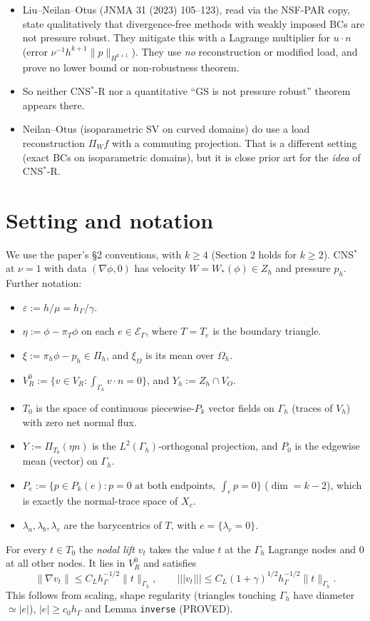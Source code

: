 \documentclass[11pt]{article}
\theoremstyle{remark}
\newcommand{\tn}[1]{|\!|\!|#1|\!|\!|}
\newcommand{\hG}{h_\Gamma}
\newcommand{\Gh}{\Gamma_h}
\begin{document}
\begin{enumerate}
\begin{itemize}
 instruction, and search engines return only its title.
 \item Liu--Neilan--Otus (JNMA 31 (2023) 105--123), read via the NSF-PAR copy, state qualitatively that divergence-free
 methods with weakly imposed BCs are not pressure robust. They mitigate this with a Lagrange multiplier for $u\cdot n$
 (error $\nu^{-1}h^{k+1}\|p\|_{H^{k+1}}$). They use \emph{no} reconstruction or modified load, and prove no lower bound or
 non-robustness theorem.
 \item So neither CNS$^\ast$-R nor a quantitative ``GS is not pressure robust'' theorem appears there.
 \item Neilan--Otus (isoparametric SV on curved domains) do use a load reconstruction $\Pi_W f$ with a commuting
 projection. That is a different setting (exact BCs on isoparametric domains), but it is close prior art for the
 \emph{idea} of CNS$^\ast$-R.
 \end{itemize}
\end{enumerate}

\section{Setting and notation}
We use the paper's §2 conventions, with $k\ge4$ (Section 2 holds for $k\ge2$). CNS$^\ast$ at $\nu=1$ with data $(\nabla\phi,0)$
has velocity $W=W_\ast(\phi)\in Z_h$ and pressure $p_h$. Further notation:
\begin{itemize}
\item $\varepsilon:=h/\mu=\hG/\gamma$.
\item $\eta:=\phi-\pi_T\phi$ on each $e\in\mathcal E_\Gamma$, where $T=T_e$ is the boundary triangle.
\item $\xi:=\pi_h\phi-p_h\in\Pi_h$, and $\xi_\Omega$ is its mean over $\Omega_h$.
\item $V_R^0:=\{v\in V_R:\int_{\Gh}v\cdot n=0\}$, and $Y_h:=Z_h\cap V_O$.
\item $T_0$ is the space of continuous piecewise-$P_k$ vector fields on $\Gh$ (traces of $V_h$) with zero net normal
flux.
\item $Y:=\Pi_{T_0}(\eta n)$ is the $L^2(\Gh)$-orthogonal projection, and $P_0$ is the edgewise mean (vector) on $\Gh$.
\item $P_e:=\{p\in P_k(e):p=0\text{ at both endpoints},\ \int_ep=0\}$ ($\dim=k-2$), which is exactly the normal-trace space
of $X_e$.
\item $\lambda_a,\lambda_b,\lambda_c$ are the barycentrics of $T$, with $e=\{\lambda_c=0\}$.
\end{itemize}
For every $t\in T_0$ the \emph{nodal lift} $v_t$ takes the value $t$ at the $\Gh$ Lagrange nodes and $0$ at all other nodes.
It lies in $V_R^0$ and satisfies
\[
\|\nabla v_t\|\le C_L\hG^{-1/2}\|t\|_{\Gh},\qquad \tn{v_t}\le C_L(1+\gamma)^{1/2}\hG^{-1/2}\|t\|_{\Gh}.\tag{1.1}
\]
This follows from scaling, shape regularity (triangles touching $\Gh$ have diameter $\simeq|e|$), $|e|\ge c_0\hG$ and Lemma
\texttt{inverse} (PROVED).
\end{document}
